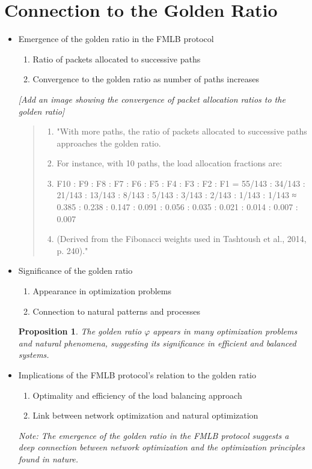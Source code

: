 \documentclass{article}
\newtheorem{proposition}{Proposition}
\begin{document}
\section{Connection to the Golden Ratio}
\begin{itemize}
    \item Emergence of the golden ratio in the FMLB protocol
    \begin{enumerate}
        \item Ratio of packets allocated to successive paths
        \item Convergence to the golden ratio as number of paths increases
    \end{enumerate}
    \textit{[Add an image showing the convergence of packet allocation ratios to the golden ratio]}
    \begin{quote}
        \begin{enumerate}[label=(\arabic*)]
            \item "With more paths, the ratio of packets allocated to successive paths approaches the golden ratio.
            \item For instance, with 10 paths, the load allocation fractions are:
            \item F10 : F9 : F8 : F7 : F6 : F5 : F4 : F3 : F2 : F1 = 55/143 : 34/143 : 21/143 : 13/143 : 8/143 : 5/143 : 3/143 : 2/143 : 1/143 : 1/143 ≈ 0.385 : 0.238 : 0.147 : 0.091 : 0.056 : 0.035 : 0.021 : 0.014 : 0.007 : 0.007
            \item (Derived from the Fibonacci weights used in Tashtoush et al., 2014, p. 240)."
        \end{enumerate}
    \end{quote}
    \item Significance of the golden ratio
    \begin{enumerate}
        \item Appearance in optimization problems
        \item Connection to natural patterns and processes
    \end{enumerate}
    \begin{proposition}
        The golden ratio $\varphi$ appears in many optimization problems and natural phenomena, suggesting its significance in efficient and balanced systems.
    \end{proposition}
    \item Implications of the FMLB protocol's relation to the golden ratio
    \begin{enumerate}
        \item Optimality and efficiency of the load balancing approach
        \item Link between network optimization and natural optimization
    \end{enumerate}
    \textit{Note: The emergence of the golden ratio in the FMLB protocol suggests a deep connection between network optimization and the optimization principles found in nature.}
\end{itemize}
\end{document}
